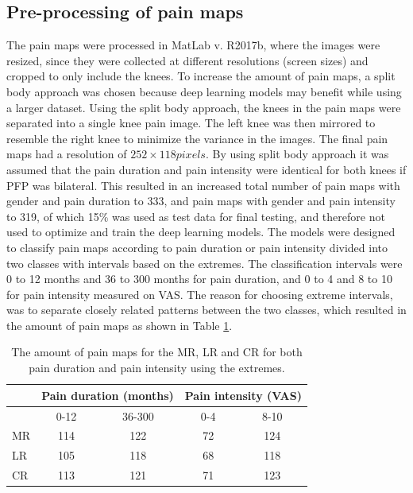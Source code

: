\subsection{Pre-processing of pain maps}
The pain maps were processed in MatLab v. R2017b, where the images were resized, since they were collected at different resolutions (screen sizes) and cropped to only include the knees. To increase the amount of pain maps, a split body approach was chosen because deep learning models may benefit while using a larger dataset. Using the split body approach, the knees in the pain maps were separated into a single knee pain image. The left knee was then mirrored to resemble the right knee to minimize the variance in the images. The final pain maps had a resolution of $252 \times 118 pixels$.
By using split body approach it was assumed that the pain duration and pain intensity were identical for both knees if PFP was bilateral. This resulted in an increased total number of pain maps with gender and pain duration to 333, and pain maps with gender and pain intensity to 319, of which 15\% was used as test data for final testing, and therefore not used to optimize and train the deep learning models. \newline
\noindent
The models were designed to classify pain maps according to pain duration or pain intensity divided into two classes with intervals based on the extremes. The classification intervals were 0 to 12 months and 36 to 300 months for pain duration, and 0 to 4 and 8 to 10 for pain intensity measured on VAS. The reason for choosing extreme intervals, was to separate closely related patterns between the two classes, which resulted in the amount of pain maps as shown in Table \ref{tab:painmaps}.

\begin{table}[H]
\centering
\begin{tabular}{@{}lcccc@{}}
\toprule
   & \multicolumn{2}{c}{Pain duration (months)} & \multicolumn{2}{c}{Pain intensity (VAS)} \\ \midrule
   & 0-12                & 36-300               & 0-4                & 8-10                \\ \midrule
MR & 114                 & 122                  & 72                 & 124                 \\
LR & 105                 & 118                  & 68                 & 118                 \\
CR & 113                 & 121                  & 71                 & 123                 \\ \bottomrule
\end{tabular}
\caption{The amount of pain maps for the MR, LR and CR for both pain duration and pain intensity using the extremes.}
\label{tab:painmaps}
\end{table}

